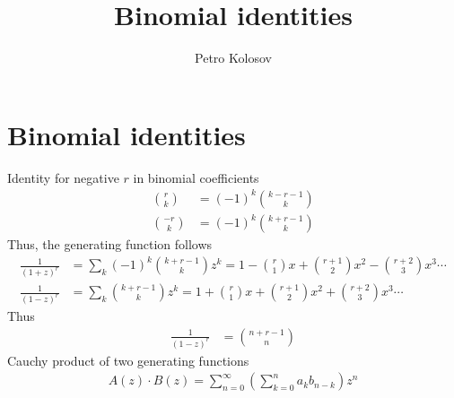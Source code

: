 ﻿\documentclass[12pt,letterpaper,oneside,reqno]{amsart}
\title[Binomial identities]
{Binomial identities}
\author[Petro Kolosov]{Petro Kolosov}
\numberwithin{equation}{section}
\begin{document}
    \maketitle

    \section{Binomial identities}\label{sec:binomial-identities}
    Identity for negative $r$ in binomial coefficients
    \begin{align*}
        \binom{r}{k}  &= (-1)^k \binom{k-r-1}{k} \\
        \binom{-r}{k} &= (-1)^k \binom{k+r-1}{k}
    \end{align*}
    Thus, the generating function follows
    \begin{align*}
        \frac{1}{(1+z)^r} &= \sum_{k} (-1)^k \binom{k+r-1}{k} z^k = 1 - \binom{r}{1}x + \binom{r+1}{2} x^2 - \binom{r+2}{3} x^3 \cdots \\
        \frac{1}{(1-z)^r} &= \sum_{k} \binom{k+r-1}{k} z^k = 1 + \binom{r}{1}x + \binom{r+1}{2} x^2 + \binom{r+2}{3} x^3 \cdots
    \end{align*}
    Thus
    \begin{align*}
        [z^n] \frac{1}{(1-z)^r} &= \binom{n+r-1}{n}
    \end{align*}
    Cauchy product of two generating functions
    \begin{align*}
        A(z) \cdot B(z) = \sum_{n=0}^{\infty} \left( \sum_{k=0}^{n} a_k b_{n-k} \right) z^n
    \end{align*}
\end{document}
